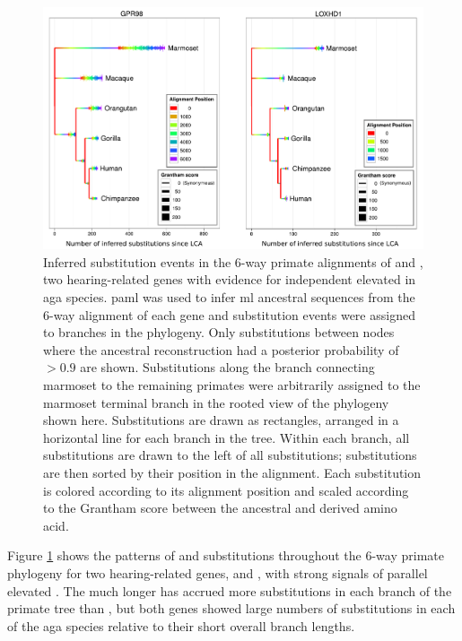 \begin{figure}
\centering
\includegraphics[scale=0.6]{Figs/gorilla_gpr98.pdf}
\caption{Inferred substitution events in the 6-way primate alignments
  of  and , two hearing-related genes with
  evidence for independent elevated \dnds in \ac{aga}
  species. \ac{paml} was used to infer \ac{ml} ancestral sequences
  \citep{Yang1995} from the 6-way alignment of each gene and
  substitution events were assigned to branches in the phylogeny. Only
  substitutions between nodes where the ancestral reconstruction had a
  posterior probability of $>0.9$ are shown. Substitutions along the
  branch connecting marmoset to the remaining primates were
  arbitrarily assigned to the marmoset terminal branch in the rooted
  view of the phylogeny shown here. Substitutions are drawn as
  rectangles, arranged in a horizontal line for each branch in the
  tree. Within each branch, all \syn substitutions are drawn to the
  left of all \nsyn substitutions; substitutions are then sorted by
  their position in the alignment. Each substitution is colored
  according to its alignment position and scaled according to the
  Grantham score \citep{Grantham1974} between the ancestral and
  derived amino acid.}
\label{fig_gorilla_gpr98}
\end{figure}

Figure \ref{fig_gorilla_gpr98} shows the patterns of \nsyn and \syn
substitutions throughout the 6-way primate phylogeny for two
hearing-related genes,  and , with strong
signals of parallel elevated \dnds. The much longer  has
accrued more substitutions in each branch of the primate tree than
, but both genes showed large numbers of \nsyn
substitutions in each of the \ac{aga} species relative to their short
overall branch lengths.

